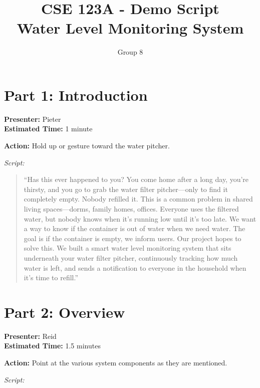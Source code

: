 \documentclass[12pt]{article}
\title{CSE 123A - Demo Script\\Water Level Monitoring System}
\author{Group 8}
\date{}
\begin{document}
\pagestyle{fancy}
\maketitle
\fancyfoot{}
\fancyhead{}

\section*{Part 1: Introduction}
\noindent\textbf{Presenter:} Pieter\\  
\noindent\textbf{Estimated Time:} 1 minute

\noindent\textbf{Action:} Hold up or gesture toward the water pitcher.

\bigskip
\noindent\textit{Script:}

\begin{quote}
``Has this ever happened to you? You come home after a long day, you're thirsty, and you go to grab the water filter pitcher---only to find it completely empty. Nobody refilled it.
This is a common problem in shared living spaces---dorms, family homes, offices. Everyone uses the filtered water, but nobody knows when it's running low until it's too late. We want a way to know if the container is out of water when we need water. The goal is if the container is empty, we inform users.
Our project hopes to solve this. We built a smart water level monitoring system that sits underneath your water filter pitcher, continuously tracking how much water is left, and sends a notification to everyone in the household when it's time to refill.''
\end{quote}

\section*{Part 2: Overview }
\noindent\textbf{Presenter:} Reid\\  
\noindent\textbf{Estimated Time:} 1.5 minutes

\noindent\textbf{Action:} Point at the various system components as they are mentioned.

\bigskip
\noindent\textit{Script:}
\end{document}
